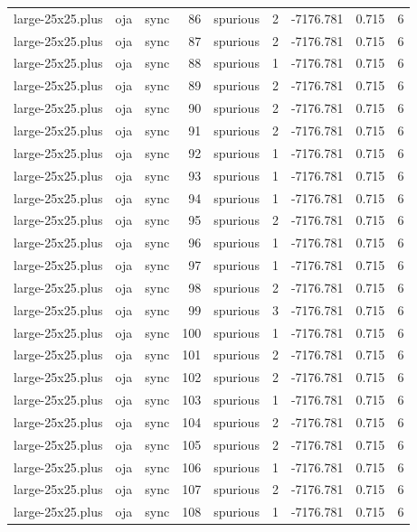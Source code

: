 \begin{tabular}{lllrlrrrr}
large-25x25.plus & oja & sync & 86 & spurious & 2 & -7176.781 & 0.715 & 6 \\
large-25x25.plus & oja & sync & 87 & spurious & 2 & -7176.781 & 0.715 & 6 \\
large-25x25.plus & oja & sync & 88 & spurious & 1 & -7176.781 & 0.715 & 6 \\
large-25x25.plus & oja & sync & 89 & spurious & 2 & -7176.781 & 0.715 & 6 \\
large-25x25.plus & oja & sync & 90 & spurious & 2 & -7176.781 & 0.715 & 6 \\
large-25x25.plus & oja & sync & 91 & spurious & 2 & -7176.781 & 0.715 & 6 \\
large-25x25.plus & oja & sync & 92 & spurious & 1 & -7176.781 & 0.715 & 6 \\
large-25x25.plus & oja & sync & 93 & spurious & 1 & -7176.781 & 0.715 & 6 \\
large-25x25.plus & oja & sync & 94 & spurious & 1 & -7176.781 & 0.715 & 6 \\
large-25x25.plus & oja & sync & 95 & spurious & 2 & -7176.781 & 0.715 & 6 \\
large-25x25.plus & oja & sync & 96 & spurious & 1 & -7176.781 & 0.715 & 6 \\
large-25x25.plus & oja & sync & 97 & spurious & 1 & -7176.781 & 0.715 & 6 \\
large-25x25.plus & oja & sync & 98 & spurious & 2 & -7176.781 & 0.715 & 6 \\
large-25x25.plus & oja & sync & 99 & spurious & 3 & -7176.781 & 0.715 & 6 \\
large-25x25.plus & oja & sync & 100 & spurious & 1 & -7176.781 & 0.715 & 6 \\
large-25x25.plus & oja & sync & 101 & spurious & 2 & -7176.781 & 0.715 & 6 \\
large-25x25.plus & oja & sync & 102 & spurious & 2 & -7176.781 & 0.715 & 6 \\
large-25x25.plus & oja & sync & 103 & spurious & 1 & -7176.781 & 0.715 & 6 \\
large-25x25.plus & oja & sync & 104 & spurious & 2 & -7176.781 & 0.715 & 6 \\
large-25x25.plus & oja & sync & 105 & spurious & 2 & -7176.781 & 0.715 & 6 \\
large-25x25.plus & oja & sync & 106 & spurious & 1 & -7176.781 & 0.715 & 6 \\
large-25x25.plus & oja & sync & 107 & spurious & 2 & -7176.781 & 0.715 & 6 \\
large-25x25.plus & oja & sync & 108 & spurious & 1 & -7176.781 & 0.715 & 6 \\

\end{tabular}
